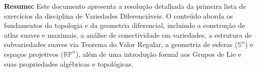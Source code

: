 \begin{center}
\end{center}
\begin{tcolorbox}[
	enhanced,
	sharp corners,
	boxrule=0.5pt,
	colback=white, 
	colframe=black,         
	width=1\textwidth,
	]%
	\textbf{Resumo:} Este documento apresenta a resolução detalhada da primeira lista de exercícios da disciplina de Variedades Diferenciáveis. O conteúdo aborda os fundamentos da topologia e da geometria diferencial, incluindo a construção de atlas suaves e maximais, a análise de conectividade em variedades, a estrutura de subvariedades suaves via Teorema do Valor Regular, a geometria de esferas ($\mathbb{S}^n$) e espaços projetivos ($\mathbb{RP}^n$), além de uma introdução formal aos Grupos de Lie e suas propriedades algébricas e topológicas.
\end{tcolorbox}
